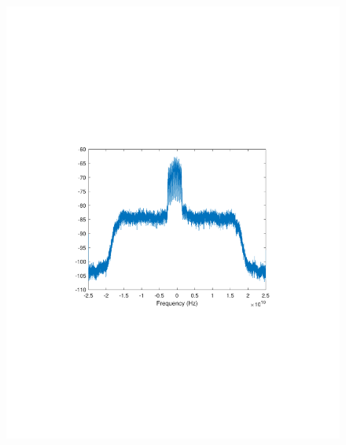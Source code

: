 \begin{refsection}
\begin{figure}[H]
	\centering
	\begin{minipage}{0.30\textwidth}
		\centering
		\includegraphics[clip, trim=4cm 8cm 4cm 8cm, width=1\textwidth]{./sdf/m_qam_system/figures/expResults/intradyne/0_4GBdInSig13dB_bfFec.pdf}
		\label{fig:4GBdEyeBefFec}
	\end{minipage}
	\begin{minipage}{0.30\textwidth}
		\centering

\end{minipage}
\end{figure}
\end{refsection}
